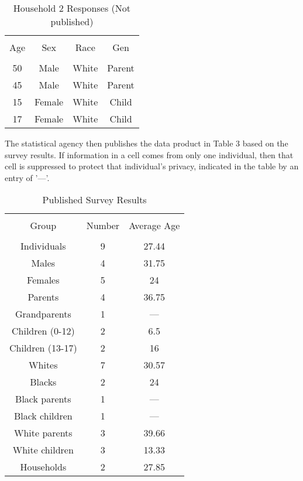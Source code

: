 \documentclass[jou,apacite]{apa6}
\begin{document}
\begin{table}[!htb]
\caption{Household 2 Responses (Not published)}\label{tab2}
\begin{tabular}{cccc}
\hline\\[-1.5ex]
Age & Sex & Race & Gen \\[0.5ex]
\hline\\[-1.5ex]
50 & Male & White & Parent\\[0.5ex]
45 & Male & White & Parent\\[0.5ex]
15 & Female & White & Child\\[0.5ex]
17 & Female & White & Child\\[0.5ex]
\hline
\end{tabular}
\end{table}

The statistical agency then publishes the data product in Table 3 based on the survey results. If information in a cell comes from only one individual, then that cell is suppressed to protect that individual's privacy, indicated in the table by an entry of '---'.

\begin{table}[!htb]
\caption{Published Survey Results}\label{tab3}
\begin{tabular}{ccc}
\hline\\[-1.5ex]
Group & Number & Average Age \\[0.5ex]
\hline\\[-1.5ex]
Individuals & 9 & 27.44 \\[0.5ex]
Males & 4 & 31.75 \\[0.5ex]
Females & 5 & 24 \\[0.5ex]
Parents & 4 & 36.75 \\[0.5ex]
Grandparents & 1 & --- \\[0.5ex]
Children (0-12) & 2 & 6.5 \\[0.5ex]
Children (13-17) & 2 & 16 \\[0.5ex]
Whites & 7 & 30.57 \\[0.5ex]
Blacks & 2 & 24 \\[0.5ex]
Black parents & 1 & --- \\[0.5ex]
Black children & 1 & ---\\[0.5ex]
White parents & 3 & 39.66 \\[0.5ex]
White children & 3 & 13.33 \\[0.5ex]
Households & 2 & 27.85 \\[0.5ex]
\hline
\end{tabular}
\end{table}
\end{document}

